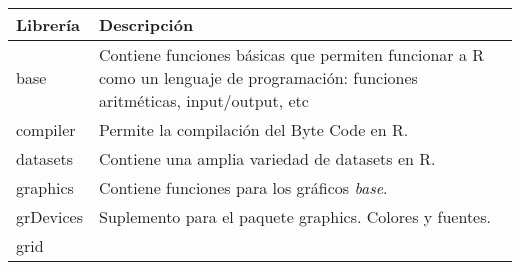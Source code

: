 \documentclass[]{book}
\begin{document}
\begin{longtable}[]{@{}ll@{}}
\toprule
\begin{minipage}[b]{0.14\columnwidth}\raggedright
Librería\strut
\end{minipage} & \begin{minipage}[b]{0.80\columnwidth}\raggedright
Descripción\strut
\end{minipage}\tabularnewline
\midrule
\endhead
\begin{minipage}[t]{0.14\columnwidth}\raggedright
base\strut
\end{minipage} & \begin{minipage}[t]{0.80\columnwidth}\raggedright
Contiene funciones básicas que permiten funcionar a R como un lenguaje de programación: funciones aritméticas, input/output, etc\strut
\end{minipage}\tabularnewline
\begin{minipage}[t]{0.14\columnwidth}\raggedright
compiler\strut
\end{minipage} & \begin{minipage}[t]{0.80\columnwidth}\raggedright
Permite la compilación del Byte Code en R.\strut
\end{minipage}\tabularnewline
\begin{minipage}[t]{0.14\columnwidth}\raggedright
datasets\strut
\end{minipage} & \begin{minipage}[t]{0.80\columnwidth}\raggedright
Contiene una amplia variedad de datasets en R.\strut
\end{minipage}\tabularnewline
\begin{minipage}[t]{0.14\columnwidth}\raggedright
graphics\strut
\end{minipage} & \begin{minipage}[t]{0.80\columnwidth}\raggedright
Contiene funciones para los gráficos \emph{base}.\strut
\end{minipage}\tabularnewline
\begin{minipage}[t]{0.14\columnwidth}\raggedright
grDevices\strut
\end{minipage} & \begin{minipage}[t]{0.80\columnwidth}\raggedright
Suplemento para el paquete graphics. Colores y fuentes.\strut
\end{minipage}\tabularnewline
\begin{minipage}[t]{0.14\columnwidth}\raggedright
grid\strut
\end{minipage} & \begin{minipage}[t]{0.80\columnwidth}\raggedright

\end{minipage}
\end{longtable}
\end{document}
